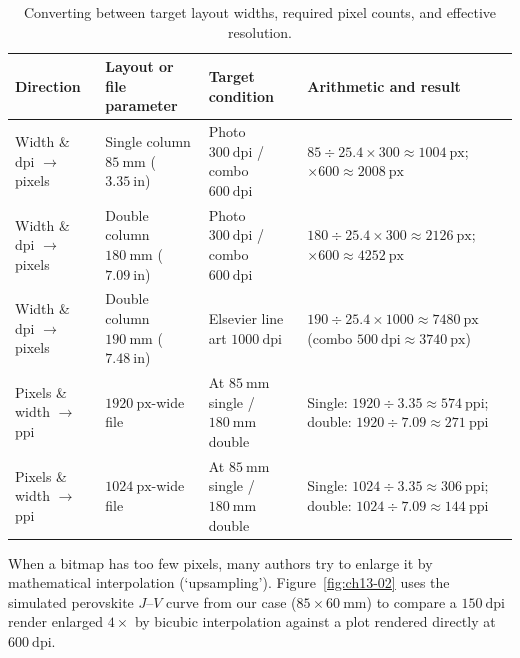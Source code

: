 \begin{table}[htbp]\centering\footnotesize
\setlength{\tabcolsep}{4pt}
\renewcommand{\arraystretch}{1.18}
\caption{Converting between target layout widths, required pixel counts, and effective resolution.}\label{tab:ch13-px-calc}
\begin{tabularx}{\linewidth}{@{}>{\raggedright\arraybackslash}p{28mm}>{\raggedright\arraybackslash}p{28mm}>{\raggedright\arraybackslash}p{28mm}Y@{}}
\toprule
\textbf{Direction} & \textbf{Layout or file parameter} & \textbf{Target condition} & \textbf{Arithmetic and result} \\
\midrule
Width \& dpi $\rightarrow$ pixels & Single column $85\ \text{mm}$ ($3.35\ \text{in}$) & Photo $300\ \text{dpi}$ / combo $600\ \text{dpi}$ & $85 \div 25.4 \times 300 \approx 1004\ \text{px}$; $\times 600 \approx 2008\ \text{px}$ \\
Width \& dpi $\rightarrow$ pixels & Double column $180\ \text{mm}$ ($7.09\ \text{in}$) & Photo $300\ \text{dpi}$ / combo $600\ \text{dpi}$ & $180 \div 25.4 \times 300 \approx 2126\ \text{px}$; $\times 600 \approx 4252\ \text{px}$ \\
Width \& dpi $\rightarrow$ pixels & Double column $190\ \text{mm}$ ($7.48\ \text{in}$) & Elsevier line art $1000\ \text{dpi}$ & $190 \div 25.4 \times 1000 \approx 7480\ \text{px}$ (combo $500\ \text{dpi} \approx 3740\ \text{px}$) \\
Pixels \& width $\rightarrow$ ppi & $1920\ \text{px}$-wide file & At $85\ \text{mm}$ single / $180\ \text{mm}$ double & Single: $1920 \div 3.35 \approx 574\ \text{ppi}$; double: $1920 \div 7.09 \approx 271\ \text{ppi}$ \\
Pixels \& width $\rightarrow$ ppi & $1024\ \text{px}$-wide file & At $85\ \text{mm}$ single / $180\ \text{mm}$ double & Single: $1024 \div 3.35 \approx 306\ \text{ppi}$; double: $1024 \div 7.09 \approx 144\ \text{ppi}$ \\
\bottomrule
\end{tabularx}
\end{table}

When a bitmap has too few pixels, many authors try to enlarge it by mathematical interpolation (`upsampling'). Figure~\ref{fig:ch13-02} uses the simulated perovskite $J\text{--}V$ curve from our case ($85 \times 60\ \text{mm}$) to compare a $150\ \text{dpi}$ render enlarged $4\times$ by bicubic interpolation against a plot rendered directly at $600\ \text{dpi}$.

